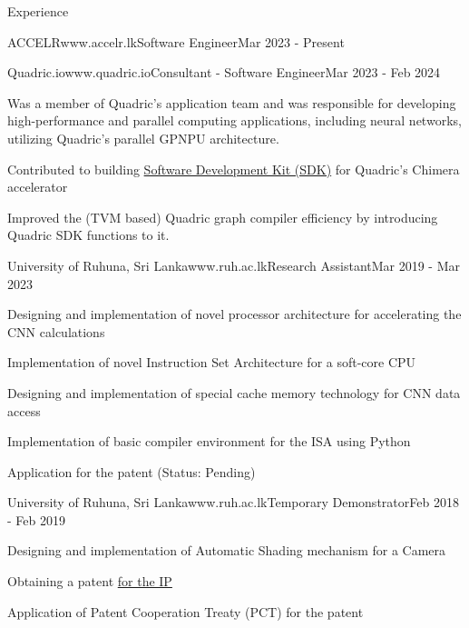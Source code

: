 \documentclass[
	11pt, %
]{./../assets/resume} %
\begin{document}
\begin{rSection}{Experience}

	\begin{rSubsectionXX}{ACCELR}{www.accelr.lk}{Software Engineer}{Mar 2023 - Present}
	\end{rSubsectionXX}

	\begin{rSubsectionX}{Quadric.io}{www.quadric.io}{Consultant - Software Engineer}{Mar 2023 - Feb 2024}
        \item Was a member of Quadric's application team and was responsible for developing high-performance and parallel computing applications, including neural networks, utilizing Quadric's parallel GPNPU architecture.
        \item Contributed to building \href{https://quadric.io/sdk/}{Software Development Kit (SDK)} for Quadric's Chimera accelerator
        \item Improved the (TVM based) Quadric graph compiler efficiency by introducing Quadric SDK functions to it.
    \end{rSubsectionX}

	\begin{rSubsectionX}{University of Ruhuna, Sri Lanka}{www.ruh.ac.lk}{Research Assistant}{Mar 2019 - Mar 2023}
		\item Designing and implementation of novel processor architecture for accelerating the CNN calculations
		\item Implementation of novel Instruction Set Architecture for a soft-core CPU
		\item Designing and implementation of special cache memory technology for CNN data access
		\item Implementation of basic compiler environment for the ISA using Python
		\item Application for the patent (Status: Pending)
	\end{rSubsectionX}

	\pagebreak

	\begin{rSubsectionX}{University of Ruhuna, Sri Lanka}{www.ruh.ac.lk}{Temporary Demonstrator}{Feb 2018 - Feb 2019}
		\item Designing and implementation of Automatic Shading mechanism for a Camera
		\item Obtaining a patent \href{https://patentscope.wipo.int/search/en/detail.jsf?docId=WO2021069993&_cid=P20-LSKB9J-42754-1}{for the IP}
		\item Application of Patent Cooperation Treaty (PCT) for the patent 
	\end{rSubsectionX}

\end{rSection}
\end{document}
